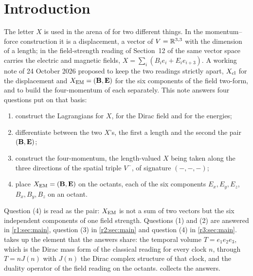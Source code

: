 \section{Introduction}
\label{r0:sec:main}

The letter $X$ is used in the arena of \cite{ES17} for two different things. In the momentum--force construction it is a displacement,
a vector of $V=\mathbb{R}^{3,3}$ with the dimension of a length; in the field-strength reading of Section~12 of \cite{ES17} the same vector space
carries the electric and magnetic fields, $X=\sum_i(B_ie_i+E_ie_{i+3})$. A working note of 24 October 2026 \cite{FMB} proposed to keep the two
readings strictly apart, $X_{\rm cl}$ for the displacement and $X_{\rm EM}=(\mathbf B,\mathbf E)$ for the six components of the field two-form, and to
build the four-momentum of each separately. This note answers four questions put on that basis:
\begin{enumerate}[label=(\arabic*),leftmargin=2.2em]
\item construct the Lagrangians for $X$, for the Dirac field and for the energies;
\item differentiate between the two $X$'s, the first a length and the second the pair $(\mathbf B,\mathbf E)$;
\item construct the four-momentum, the length-valued $X$ being taken along the three directions of the spatial triple $V^-$, of signature
$(-,-,-)$;
\item place $X_{\rm EM}=(\mathbf B,\mathbf E)$ on the octants, each of the six components $E_x,E_y,E_z$, $B_x,B_y,B_z$ on an octant.
\end{enumerate}
Question (4) is read as the pair: $X_{\rm EM}$ is not a sum of two vectors but the six independent components of one field strength.
Questions (1) and (2) are answered in \cref{r1:sec:main}, question (3) in \cref{r2:sec:main} and question (4) in \cref{r3:sec:main}.
 takes up the element that the answers share: the temporal volume $T=e_1e_2e_3$, which is the Dirac mass form of the
classical reading for every clock $n$, through $T=nJ(n)$ with $J(n)$ the Dirac complex structure of that clock, and the duality operator
of the field reading on the octants.  collects the answers.

